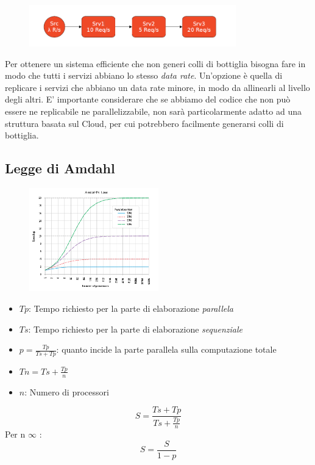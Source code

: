 \documentclass{article}
\begin{document}
		\begin{figure}[ht]
		\centering
		\includegraphics[width=0.8\textwidth]{SAC_02.png}
		\end{figure}
		
		Per ottenere un sistema efficiente che non generi colli di bottiglia bisogna fare in modo che tutti i servizi abbiano lo stesso \textit{data rate}. Un'opzione è quella di replicare i servizi che abbiano un data rate minore, in modo da allinearli al livello degli altri.
		E' importante considerare che se abbiamo del codice che non può essere ne replicabile ne parallelizzabile, non sarà particolarmente adatto ad una struttura basata sul Cloud, per cui potrebbero facilmente generarsi colli di bottiglia.
		
		\subsection{Legge di Amdahl}
		\begin{figure}[ht]
			\centering
			\includegraphics[width=0.5\textwidth]{SAC_03.png}
		\end{figure}
		
		\begin{itemize}
		    \item $Tp$: Tempo richiesto per la parte di elaborazione \emph{parallela}
		    \item $Ts$: Tempo richiesto per la parte di elaborazione \emph{sequenziale}
		    \item $p=\frac{Tp}{Ts+Tp}$: quanto incide la parte parallela sulla computazione totale
		    \item $Tn=Ts+\frac{Tp}{n}$
		    \item $n$: Numero di processori
		\end{itemize}
		\[S=\frac{Ts+Tp}{Ts+\frac{Tp}{n}}\]
		Per n \textrightarrow $\infty$ : \[S=\frac{S}{1-p}\]
		
\end{document}
